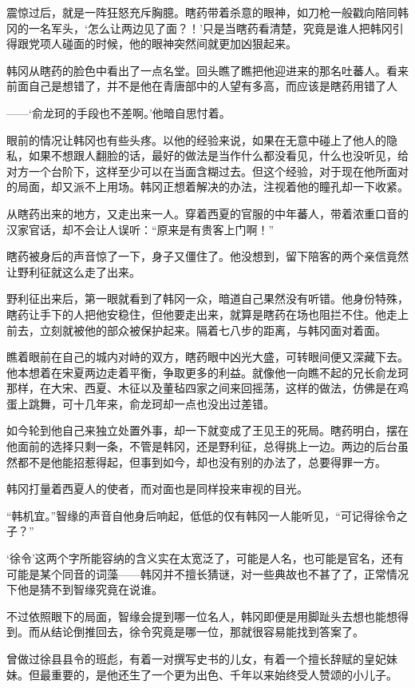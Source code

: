 震惊过后，就是一阵狂怒充斥胸臆。瞎药带着杀意的眼神，如刀枪一般戳向陪同韩冈的一名军头，‘怎么让两边见了面？！’只是当瞎药看清楚，究竟是谁人把韩冈引得跟党项人碰面的时候，他的眼神突然间就更加凶狠起来。

韩冈从瞎药的脸色中看出了一点名堂。回头瞧了瞧把他迎进来的那名吐蕃人。看来前面自己是想错了，并不是他在青唐部中的人望有多高，而应该是瞎药用错了人

——‘俞龙珂的手段也不差啊。’他暗自思忖着。

眼前的情况让韩冈也有些头疼。以他的经验来说，如果在无意中碰上了他人的隐私，如果不想跟人翻脸的话，最好的做法是当作什么都没看见，什么也没听见，给对方一个台阶下，这样至少可以在当面含糊过去。但这个经验，对于现在他所面对的局面，却又派不上用场。韩冈正想着解决的办法，注视着他的瞳孔却一下收紧。

从瞎药出来的地方，又走出来一人。穿着西夏的官服的中年蕃人，带着浓重口音的汉家官话，却不会让人误听：“原来是有贵客上门啊！”

瞎药被身后的声音惊了一下，身子又僵住了。他没想到，留下陪客的两个亲信竟然让野利征就这么走了出来。

野利征出来后，第一眼就看到了韩冈一众，暗道自己果然没有听错。他身份特殊，瞎药让手下的人把他安稳住，但他要走出来，就算是瞎药在场也阻拦不住。他走上前去，立刻就被他的部众被保护起来。隔着七八步的距离，与韩冈面对着面。

瞧着眼前在自己的城内对峙的双方，瞎药眼中凶光大盛，可转眼间便又深藏下去。他本想着在宋夏两边走着平衡，争取更多的利益。就像他一向瞧不起的兄长俞龙珂那样，在大宋、西夏、木征以及董毡四家之间来回摇荡，这样的做法，仿佛是在鸡蛋上跳舞，可十几年来，俞龙珂却一点也没出过差错。

如今轮到他自己来独立处置外事，却一下就变成了王见王的死局。瞎药明白，摆在他面前的选择只剩一条，不管是韩冈，还是野利征，总得挑上一边。两边的后台虽然都不是他能招惹得起，但事到如今，却也没有别的办法了，总要得罪一方。

韩冈打量着西夏人的使者，而对面也是同样投来审视的目光。

“韩机宜。”智缘的声音自他身后响起，低低的仅有韩冈一人能听见，“可记得徐令之子？”

‘徐令’这两个字所能容纳的含义实在太宽泛了，可能是人名，也可能是官名，还有可能是某个同音的词藻——韩冈并不擅长猜谜，对一些典故也不甚了了，正常情况下他是猜不到智缘究竟在说谁。

不过依照眼下的局面，智缘会提到哪一位名人，韩冈即便是用脚趾头去想也能想得到。而从结论倒推回去，徐令究竟是哪一位，那就很容易能找到答案了。

曾做过徐县县令的班彪，有着一对撰写史书的儿女，有着一个擅长辞赋的皇妃妹妹。但最重要的，是他还生了一个更为出色、千年以来始终受人赞颂的小儿子。

